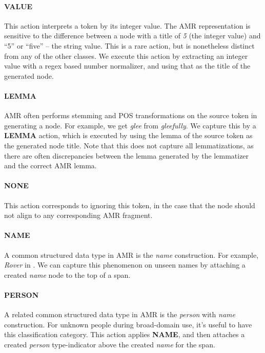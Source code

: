 \documentclass[11pt]{article}
\newcommand\w[1]{\textit{#1}} %
\newcommand\n[1]{\textit{#1}} %
\begin{document}
\paragraph{VALUE} This action interprets a token by its integer value. 
The AMR representation is sensitive to the difference between a node with a title
  of \n{5} (the integer value) and ``5'' or ``five'' -- the string value.
This is a rare action, but is nonetheless distinct from any of the other classes.
We execute this action by extracting an integer value with a regex based number normalizer, and using that as the title of the generated node.

\paragraph{LEMMA} AMR often performs stemming and POS transformations on the source token in generating a node. 
For example, we get \n{glee} from \w{gleefully}.
We capture this by a \textbf{LEMMA} action, which is executed by using the lemma of the source token as the generated node title.
Note that this does not capture all lemmatizations, as there are often discrepancies
  between the lemma generated by the lemmatizer and the correct AMR lemma.

\paragraph{NONE} This action corresponds to ignoring this token, in the case that
  the node should not align to any corresponding AMR fragment.

\paragraph{NAME} A common structured data type in AMR is the \n{name} construction. 
For example, \w{Rover} in .
We can capture this phenomenon on unseen names by attaching a created \n{name} node to the top of a span.

\paragraph{PERSON} A related common structured data type in AMR is the \n{person} with \n{name} construction. 
For unknown people during broad-domain use, it's useful to have this classification category.
This action applies \textbf{NAME}, and then attaches a created \n{person} type-indicator above the created \n{name} for the span.
\end{document}
